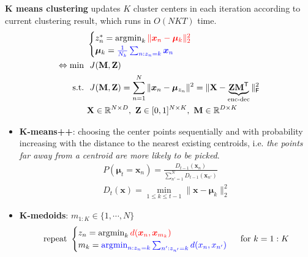 \textbf{K means clustering} updates $K$ cluster centers 
in each iteration according to current clustering result, 
which runs in $O(NKT)$ time.
\begin{align}
    & \begin{cases}
        z_n^* = \operatorname*{\arg\!min}_k{\color{red}\|\bm{x}_n-\bm{\mu}_k\|_2^2} \\
        \bm{\mu}_k={\color{blue}\frac{1}{N_k}\sum_{n:z_n=k}\bm{x}_n}
    \end{cases} \\
    \Leftrightarrow \min~&~J(\mathbf{M},\mathbf{Z}) \\
    \mathrm{s.t.}~&~J(\mathbf{M},\mathbf{Z}) = \sum_{n=1}^N\|\bm{x}_n-\bm{\mu}_{z_n}\|^2=\|\mathbf{X}-\underbrace{\mathbf{ZM}^\mathsf{T}}_{\text{enc-dec}}\|^2_\mathsf{F} \\
    & \mathbf{X}\in\mathbb{R}^{N\times D},~\mathbf{Z}\in [0,1]^{N\times K},~\mathbf{M}\in\mathbb{R}^{D\times K}
\end{align}
\begin{itemize}
    \item \textbf{K-means++}: choosing the center points sequentially and with probability increasing with the distance to the nearest existing centroids,
    i.e. \textit{the points far away from a centroid are more likely to be picked}.
    \begin{gather}
        P(\bm{\mu}_t=\bm{x}_n) = \frac{D_{t-1}(\bm{x}_n)}{\sum_{n'=1}^ND_{t-1}(\bm{x}_{n'})} \\
        D_t(\bm{x}) = \min_{1\leq k \leq t-1} \|\bm{x}-\bm{\mu}_k\|^2_2
    \end{gather}

    \item \textbf{K-medoids}: $m_{1:K}\in\{1,\cdots,N\}$
    \begin{gather}
        \text{repeat}~
        \begin{cases}
            z_n=\operatorname*{\arg\!min}_k {\color{red}d(\bm{x}_n,\bm{x}_{m_k})} \\
            m_k={\color{blue}\operatorname*{\arg\!min}_{n:z_n=k} \sum_{n':z_{n'}=k} d(x_n,x_{n'})}
        \end{cases}~\text{for}~k=1:K    
    \end{gather}
\end{itemize}

